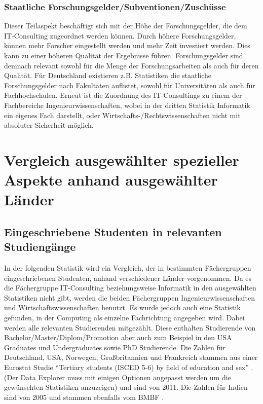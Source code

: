 \subsubsection*{Staatliche Forschungsgelder/Subventionen/Zuschüsse}
Dieser Teilaspekt beschäftigt sich mit der Höhe der Forschungsgelder, die dem IT-Consulting zugeordnet werden können. Durch höhere Forschungsgelder, können mehr Forscher eingestellt werden und mehr Zeit investiert werden. Dies kann zu einer höheren Qualität der Ergebnisse führen. Forschungsgelder sind demnach relevant sowohl für die Menge der Forschungsarbeiten als auch für deren Qualität.
Für Deutschland existieren z.B. Statistiken die staatliche Forschungsgelder nach Fakultäten auflistet, sowohl für Universitäten als auch für Fachhochschulen. 
 \cite {ausgabenfakuni} \cite {ausgabenfakfach} \cite {ausgabenbmbf} Erneut ist die Zuordnung des IT-Consultings zu einem der Fachbereiche Ingenieurwissenschaften, wobei in der dritten Statistik Informatik ein eigenes Fach darstellt, oder Wirtschafts-/Rechtswissenschaften nicht mit absoluter Sicherheit möglich.

\section{Vergleich ausgewählter spezieller Aspekte anhand ausgewählter Länder}

\subsection*{Eingeschriebene Studenten in relevanten Studiengänge}
In der folgenden Statistik wird ein Vergleich, der in bestimmten Fächergruppen eingeschriebenen Studenten, anhand verschiedener Länder vorgenommen. Da es die Fächergruppe IT-Consulting beziehungsweise Informatik in den ausgewählten Statistiken nicht gibt, werden die beiden Fächergruppen Ingenieurwissenschaften und Wirtschaftswissenschaften benutzt. Es wurde jedoch auch eine Statistik gefunden, in der Computing als einzelne Fachrichtung angegeben wird. Dabei werden alle relevanten Studierenden mitgezählt. Diese enthalten Studierende von Bachelor/Master/Diplom/Promotion aber auch zum Beispiel in den USA Graduates und Undergraduates sowie PhD Studierende.
Die Zahlen für Deutschland, USA, Norwegen, Großbritannien und Frankreich stammen aus einer Eurostat Studie ``Tertiary students (ISCED 5-6) by field of education and sex'' \cite{studierende}. (Der Data Explorer muss mit einigen Optionen angepasst werden um die gewünschten Statistiken anzuzeigen) und sind von 2011. Die Zahlen für Indien sind von 2005 und stammen ebenfalls vom BMBF \cite{indienstudierende}.

